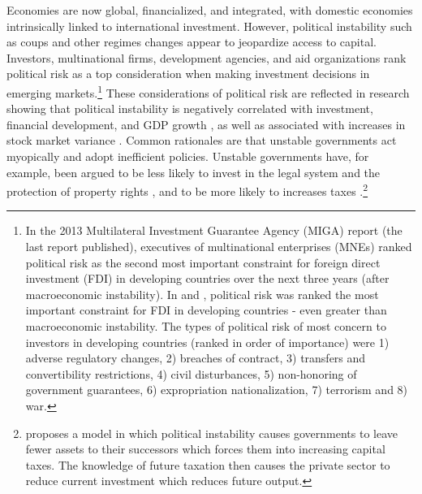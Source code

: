 \documentclass[12pt,final,fleqn]{article}
\theoremstyle{plain}
\begin{document}
Economies are now global, financialized, and integrated, with domestic economies intrinsically linked to international investment. However, political instability such as coups and other regimes changes appear to jeopardize access to capital. Investors, multinational firms, development agencies, and aid organizations rank political risk as a top consideration when making investment decisions in emerging markets.\footnote{In the 2013 Multilateral Investment Guarantee Agency (MIGA) \citet{wipr2013} report (the last report published), executives of multinational enterprises (MNEs) ranked political risk as the second most important constraint for foreign direct investment (FDI) in developing countries over the next three years (after macroeconomic instability). In \citet{wipr2011} and  \citet{wipr2012}, political risk was ranked the most important constraint for FDI in developing countries - even greater than macroeconomic instability. The types of political risk of most concern to investors in developing countries (ranked in order of importance) were 1) adverse regulatory changes, 2) breaches of contract, 3) transfers and convertibility restrictions, 4) civil disturbances, 5) non-honoring of government guarantees, 6) expropriation nationalization, 7) terrorism and 8) war.} These considerations of political risk are reflected in research showing that political instability is negatively correlated with investment, financial development, and GDP growth \citep{aisen2013does, alesina1996income, alesina1996political, fosu1992political, jong2009measurement, roe2011political, baker2016measuring}, as well as associated with increases in stock market variance \citep{leblang2005government, jensen2005market, liu2015economic}. Common rationales are that unstable governments act myopically and adopt inefficient policies. Unstable governments have, for example, been argued to be less likely to invest in the legal system and the protection of property rights \citep{svensson1998investment}, and to be more likely to increases taxes \citep{devereux1998political}.\footnote{\citet{devereux1998political} proposes a model in which political instability causes governments to leave fewer assets to their successors which forces them into increasing capital taxes. The knowledge of future taxation then causes the private sector to reduce current investment which reduces future output.} 

\end{document}
